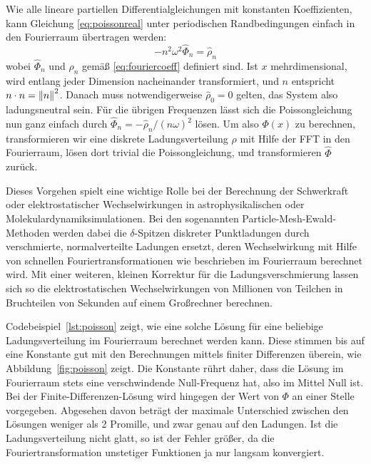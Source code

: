Wie alle lineare partiellen Differentialgleichungen mit konstanten
Koeffizienten, kann Gleichung \eqref{eq:poissonreal} unter
periodischen Randbedingungen einfach in den Fourierraum übertragen
werden:
\begin{equation}
  \label{eq:poissonft}
  -n^2\omega^2\hat\Phi_n  = \hat\rho_n
\end{equation}
wobei $\hat\Phi_n$ und $\hat\rho_n$ gemäß \eqref{eq:fouriercoeff}
definiert sind. Ist $x$ mehrdimensional, wird entlang jeder Dimension
nacheinander transformiert, und $n$ entspricht $n\cdot n =
\left\lVert{n}\right\rVert^2$. Danach muss notwendigerweise $\hat\rho_0 = 0$ gelten, das
System also ladungsneutral sein. Für die übrigen Frequenzen lässt sich
die Poissongleichung nun ganz einfach durch
$\hat\Phi_n  = -\hat\rho_n/(n\omega)^2$ lösen. Um also $\Phi(x)$ zu
berechnen, transformieren wir eine diskrete Ladungsverteilung $\rho$
mit Hilfe der FFT in den Fourierraum, lösen dort trivial die
Poissongleichung, und transformieren $\hat\Phi$ zurück.

%

Dieses Vorgehen spielt eine wichtige Rolle bei der Berechnung der
Schwerkraft oder elektrostatischer Wechselwirkungen in
astrophysikalischen oder Molekulardynamiksimulationen. Bei den
sogenannten Particle-Mesh-Ewald-Methoden werden dabei die
$\delta$-Spitzen diskreter Punktladungen durch verschmierte,
normalverteilte Ladungen ersetzt, deren Wechselwirkung mit Hilfe von
schnellen Fouriertransformationen wie beschrieben im Fourierraum
berechnet wird. Mit einer weiteren, kleinen Korrektur für die
Ladungsverschmierung lassen sich so die elektrostatischen
Wechselwirkungen von Millionen von Teilchen in Bruchteilen von
Sekunden auf einem Großrechner berechnen.

Codebeispiel~\ref{lst:poisson} zeigt, wie eine solche Lösung für eine
beliebige Ladungsverteilung im Fourierraum berechnet werden
kann. Diese stimmen bis auf eine Konstante gut mit den Berechnungen
mittels finiter Differenzen überein, wie Abbildung~\ref{fig:poisson}
zeigt. Die Konstante rührt daher, dass die Lösung im Fourierraum stets
eine verschwindende Null-Frequenz hat, also im Mittel Null ist. Bei
der Finite-Differenzen-Lösung wird hingegen der Wert von $\Phi$ an
einer Stelle vorgegeben. Abgesehen davon beträgt der maximale
Unterschied zwischen den Lösungen weniger als 2 Promille, und zwar
genau auf den Ladungen. Ist die Ladungsverteilung nicht glatt, so ist
der Fehler größer, da die Fouriertransformation unstetiger Funktionen
ja nur langsam konvergiert.

